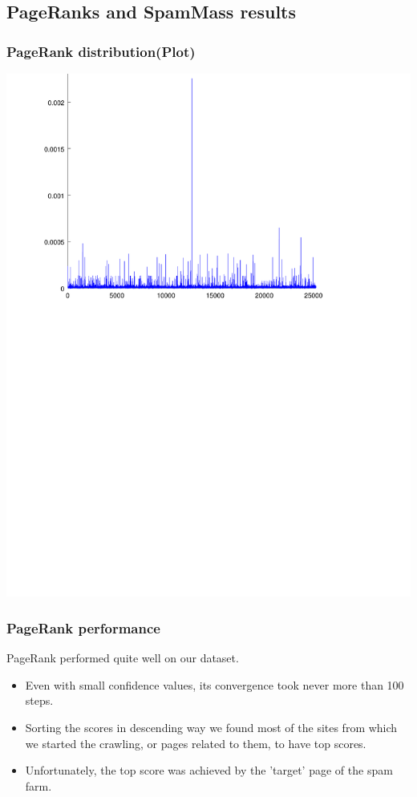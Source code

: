 \documentclass{beamer}
\begin{document}
\subsection{PageRanks and SpamMass results}

\begin{frame}
\frametitle{PageRank distribution(Plot)}
     \includegraphics[width=\textwidth,keepaspectratio]{Pictures/Pagerank.pdf}
\end{frame}

\begin{frame}
\frametitle{PageRank performance}
PageRank performed quite well on our dataset.
\begin{itemize}
\item Even with small confidence values, its convergence took never more than 100 steps.
\item Sorting the scores in descending way we found most of the sites from which we started the crawling, or pages related to them, to have top scores.
\item Unfortunately, the top score was achieved by the 'target' page of the spam farm.
\end{itemize}
\end{frame}
\end{document}
